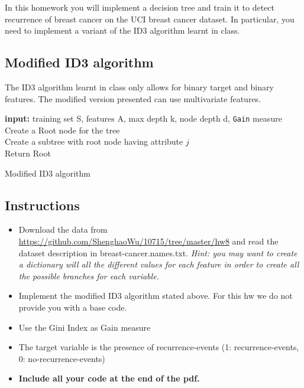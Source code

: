 \documentclass{article}
\begin{document}
In this homework you will implement a decision tree and train it to detect recurrence of breast cancer on the UCI breast cancer dataset. In particular, you need to implement a variant of the ID3 algorithm learnt in class.

\subsection{Modified ID3 algorithm}
The ID3 algorithm learnt in class only allows for binary target and binary features. The modified version presented can use multivariate features. \\

\begin{algorithm}[H]
\SetAlgoLined
\textbf{input:} training set S, features A, max depth k, node depth d, \texttt{Gain} measure\\
Create a Root node for the tree \\
Create a subtree with root node having attribute $j$ \\
Return Root
 \caption{Modified ID3 algorithm}
\end{algorithm}

\subsection{Instructions}
\begin{itemize}
\item Download the data from \url{https://github.com/ShenghaoWu/10715/tree/master/hw8} and read the dataset description in breast-cancer.names.txt. \textit{Hint: you may want to create a dictionary will all the different values for each feature in order to create all the possible branches for each variable.}
\item Implement the modified ID3 algorithm stated above. For this hw we do not provide you with a base code.
\item Use the Gini Index as Gain measure
\item The target variable is the presence of recurrence-events (1: recurrence-events, 0: no-recurrence-events)
\item \textbf{Include all your code at the end of the pdf.}
\end{itemize}
\end{document}
